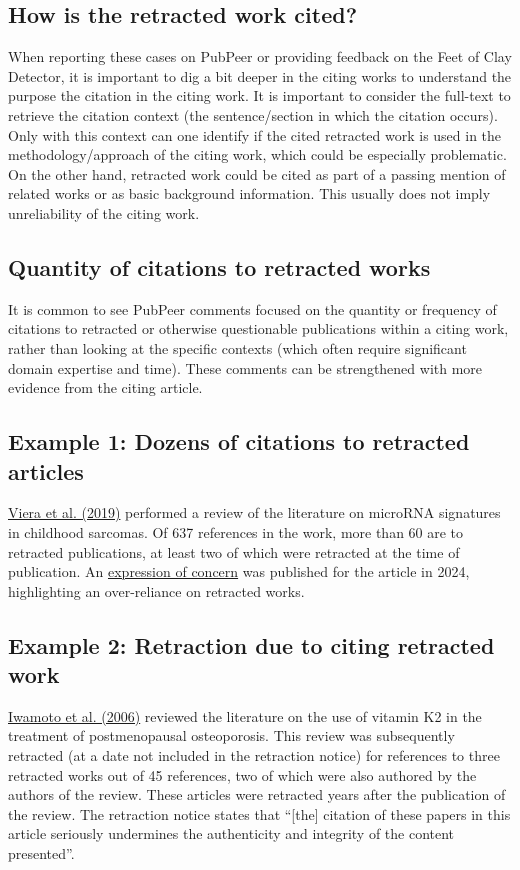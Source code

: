 \documentclass[letterpaper, 12pt]{article}
\begin{document}
\subsection*{How is the retracted work cited?}

When reporting these cases on PubPeer or providing feedback on the Feet of Clay Detector, it is important to dig a bit deeper in the citing works to understand the purpose the citation in the citing work. It is important to consider the full-text to retrieve the citation context (the sentence/section in which the citation occurs). Only with this context can one identify if the cited retracted work is used in the methodology/approach of the citing work, which could be especially problematic. On the other hand, retracted work could be cited as part of a passing mention of related works or as basic background information. This usually does not imply unreliability of the citing work. 

\subsection*{Quantity of citations to retracted works}

It is common to see PubPeer comments focused on the quantity or frequency of citations to retracted or otherwise questionable publications within a citing work, rather than looking at the specific contexts (which often require significant domain expertise and time). These comments can be strengthened with more evidence from the citing article. 

\subsection*{Example 1: Dozens of citations to retracted articles}
\href{https://doi.org/10.1007/s12094-019-02104-z}{Viera et al. (2019)} performed a review of the literature on microRNA signatures in childhood sarcomas. Of 637 references in the work, more than 60 are to retracted publications, at least two of which were retracted at the time of publication. An \href{https://doi.org/10.1007/s12094-024-03518-0}{expression of concern} was published for the article in 2024, highlighting an over-reliance on retracted works.
\subsection*{Example 2: Retraction due to citing retracted work}
\href{http://dx.doi.org/10.2174/157488606775252629}{Iwamoto et al. (2006)} reviewed the literature on the use of vitamin K2 in the treatment of postmenopausal osteoporosis. This review was subsequently retracted (at a date not included in the retraction notice) for references to three retracted works out of 45 references, two of which were also authored by the authors of the review. These articles were retracted years after the publication of the review. The retraction notice states that ``[the] citation of these papers in this article seriously undermines the authenticity and integrity of the content presented''.
\end{document}
